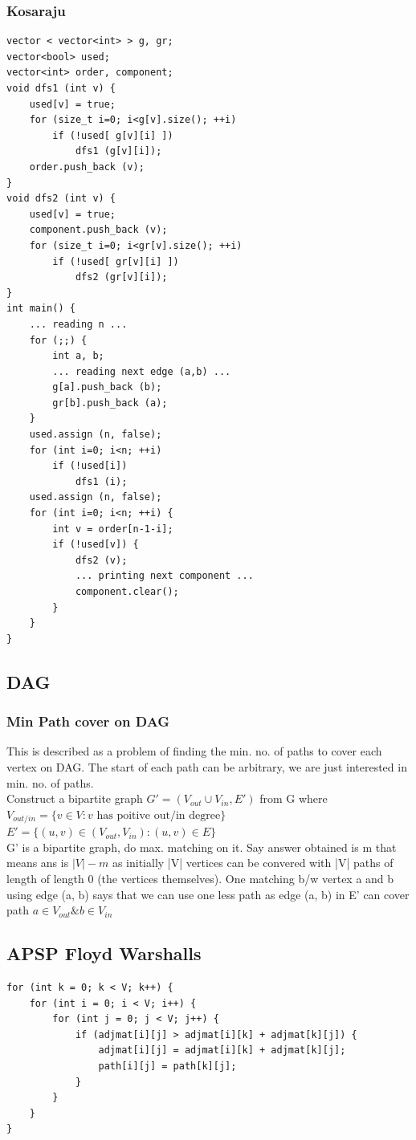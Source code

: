 \documentclass[8pt, a4paper, oneside, twocolumn]{extarticle}
\begin{document}
\subsubsection{Kosaraju}
\begin{verbatim}
vector < vector<int> > g, gr;
vector<bool> used;
vector<int> order, component;
void dfs1 (int v) {
    used[v] = true;
    for (size_t i=0; i<g[v].size(); ++i)
        if (!used[ g[v][i] ])
            dfs1 (g[v][i]);
    order.push_back (v);
}
void dfs2 (int v) {
    used[v] = true;
    component.push_back (v);
    for (size_t i=0; i<gr[v].size(); ++i)
        if (!used[ gr[v][i] ])
            dfs2 (gr[v][i]);
}
int main() {
    ... reading n ...
    for (;;) {
        int a, b;
        ... reading next edge (a,b) ...
        g[a].push_back (b);
        gr[b].push_back (a);
    }
    used.assign (n, false);
    for (int i=0; i<n; ++i)
        if (!used[i])
            dfs1 (i);
    used.assign (n, false);
    for (int i=0; i<n; ++i) {
        int v = order[n-1-i];
        if (!used[v]) {
            dfs2 (v);
            ... printing next component ...
            component.clear();
        }
    }
}
\end{verbatim}
\subsection{DAG}
\subsubsection{Min Path cover on DAG}
This is described as a problem of finding the min. no. of paths to cover each vertex on DAG. The start of each path can be arbitrary, we are just interested in min. no. of paths.
\\Construct a bipartite graph $G' = (V_{out} \cup V_{in}, E')$ from G where $V_{out/in} = \{v \in V: v \text{ has poitive out/in degree}\}$
\\$E' = \{(u, v) \in (V_{out}, V_{in}) : (u, v) \in E\}$
\\G' is a bipartite graph, do max. matching on it. Say answer obtained is m that means ans is $|V| - m$ as initially |V| vertices can be convered with |V| paths of length of length 0 (the vertices themselves). One matching b/w vertex a and b using edge (a, b) says that we can use one less path as edge (a, b) in E' can cover path $a \in V_{out} \& b\in V_{in}$
\subsection{APSP Floyd Warshalls}
\begin{verbatim}
for (int k = 0; k < V; k++) {
    for (int i = 0; i < V; i++) {
        for (int j = 0; j < V; j++) {
            if (adjmat[i][j] > adjmat[i][k] + adjmat[k][j]) {
                adjmat[i][j] = adjmat[i][k] + adjmat[k][j];
                path[i][j] = path[k][j];
            }
        }
    }
}
\end{verbatim}
\end{document}
